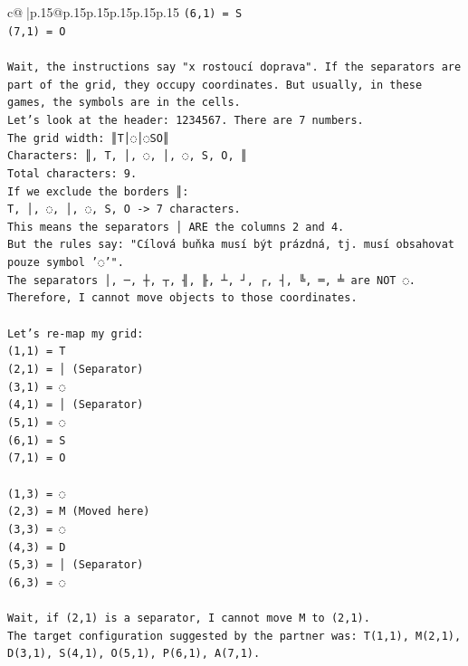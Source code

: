 \documentclass{article}
\begin{document}
{\begin{supertabular}{c@{$\;$}|p{.15\linewidth}@{}p{.15\linewidth}p{.15\linewidth}p{.15\linewidth}p{.15\linewidth}p{.15\linewidth}}
{{{\texttt{(6,1) = S} \\
\texttt{(7,1) = O} \\
\\ 
\texttt{Wait, the instructions say "x rostoucí doprava". If the separators are part of the grid, they occupy coordinates. But usually, in these games, the symbols are in the cells.} \\
\texttt{Let's look at the header: 1234567. There are 7 numbers.} \\
\texttt{The grid width: ║T│◌│◌SO║} \\
\texttt{Characters: ║, T, │, ◌, │, ◌, S, O, ║} \\
\texttt{Total characters: 9.} \\
\texttt{If we exclude the borders ║:} \\
\texttt{T, │, ◌, │, ◌, S, O {-}> 7 characters.} \\
\texttt{This means the separators │ ARE the columns 2 and 4.} \\
\texttt{But the rules say: "Cílová buňka musí být prázdná, tj. musí obsahovat pouze symbol '◌'".} \\
\texttt{The separators │, ─, ┼, ┬, ╢, ╟, ┴, ┘, ┌, ┤, ╚, ═, ╧ are NOT ◌.} \\
\texttt{Therefore, I cannot move objects to those coordinates.} \\
\\ 
\texttt{Let's re{-}map my grid:} \\
\texttt{(1,1) = T} \\
\texttt{(2,1) = │ (Separator)} \\
\texttt{(3,1) = ◌} \\
\texttt{(4,1) = │ (Separator)} \\
\texttt{(5,1) = ◌} \\
\texttt{(6,1) = S} \\
\texttt{(7,1) = O} \\
\\ 
\texttt{(1,3) = ◌} \\
\texttt{(2,3) = M (Moved here)} \\
\texttt{(3,3) = ◌} \\
\texttt{(4,3) = D} \\
\texttt{(5,3) = │ (Separator)} \\
\texttt{(6,3) = ◌} \\
\\ 
\texttt{Wait, if (2,1) is a separator, I cannot move M to (2,1).} \\
\texttt{The target configuration suggested by the partner was: T(1,1), M(2,1), D(3,1), S(4,1), O(5,1), P(6,1), A(7,1).} \\
}}}
\end{supertabular}}
\end{document}
